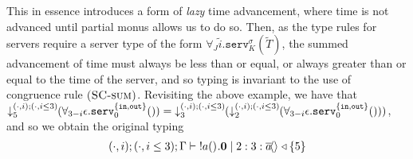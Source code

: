 This in essence introduces a form of \textit{lazy} time advancement, where time is not advanced until partial monus allows us to do so. Then, as the type rules for servers require a server type of the form $\forall_J\widetilde{i}.\texttt{serv}^\sigma_K(\widetilde{T})$, the summed advancement of time must always be less than or equal, or always greater than or equal to the time of the server, and so typing is invariant to the use of congruence rule $\runa{SC-sum}$. Revisiting the above example, we have that $\susume{\forall_{3-i}\epsilon.\texttt{serv}^{\{\texttt{in},\texttt{out}\}}_0()}{(\cdot,i)}{(\cdot,i\leq 3)}{5} =\; \susume{\susume{\forall_{3-i}\epsilon.\texttt{serv}^{\{\texttt{in},\texttt{out}\}}_0()}{(\cdot,i)}{(\cdot,i\leq 3)}{2}}{(\cdot,i)}{(\cdot,i\leq 3)}{3}$, and so we obtain the original typing
\begin{align*}
    (\cdot,i);(\cdot,i\leq 3);\Gamma\vdash\; !\inputch{a}{}{}{\nil}  \mid 2 : 3 : \asyncoutputch{a}{}{} \triangleleft \{5\}
\end{align*}





